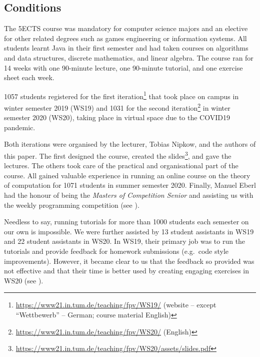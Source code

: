 \subsection{Conditions}

The 5ECTS course was mandatory for computer science majors and
an elective for other related degrees such as games engineering or information systems.
All students learnt Java in their first semester and had taken courses on algorithms and data structures,
discrete mathematics, and linear algebra.
The course ran for 14 weeks with
one 90-minute lecture,
one 90-minute tutorial,
and one exercise sheet each week.

1057 students registered for
the first iteration\footnote{\url{https://www21.in.tum.de/teaching/fpv/WS19/} (website -- except ``Wettbewerb'' -- German; course material English)} that took place on campus in winter semester 2019 (WS19) and
1031 for the second iteration\footnote{\url{https://www21.in.tum.de/teaching/fpv/WS20/} (English)} in winter semester 2020 (WS20), taking place in virtual space due to the COVID19 pandemic.

Both iterations were organised by the lecturer, Tobias Nipkow, and the authors of this paper.
The first designed the course, created the slides\footnote{\url{https://www21.in.tum.de/teaching/fpv/WS20/assets/slides.pdf}}, and gave the lectures.
The others took care of the practical and organisational part of the course.
All gained valuable experience in running an online course on the theory of computation for 1071
students in summer semester 2020.
Finally, Manuel Eberl had the honour of being the \emph{Masters of Competition Senior} and assisting us with the weekly programming competition (see ).

Needless to say,
running tutorials for more than 1000
students each semester on our own is impossible.
We were further assisted by
13 student assistants in WS19 and
22 student assistants in WS20.
In WS19, their primary job was to run the tutorials and provide feedback for homework submissions (e.g.\ code style improvements).
However, it became clear to us
that the feedback so provided was not effective
and that their time is better used by creating engaging exercises in WS20 (see ).



